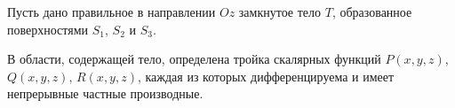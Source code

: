 
\vspace{10pt}

\begin{multicols}{2}
  
  \columnbreak

  Пусть дано правильное в направлении \(Oz\) замкнутое тело \(T\), образованное
  поверхностями \(S_{1}\), \(S_{2}\) и \(S_{3}\).

  В области, содержащей тело, определена тройка скалярных функций
  \(P(x, y, z)\), \(Q(x, y, z)\), \(R(x, y, z)\), каждая из которых
  дифференцируема и имеет непрерывные частные производные.
\end{multicols}
  
